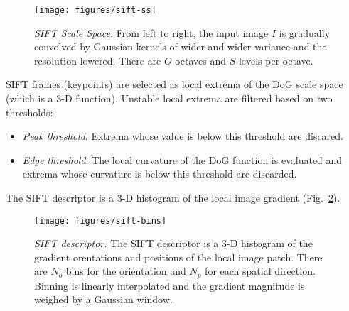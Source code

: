 \documentclass{article}
\begin{document}
\begin{figure}
\begin{center}
\texttt{[image: figures/sift-ss]}
\end{center}
\caption{{\em SIFT Scale Space.} From left to right, the input image
  $I$ is gradually convolved by Gaussian kernels of wider and wider
  variance and the resolution lowered. There are $O$ octaves and $S$
  levels per octave.}\label{fig:sift-ss}
\end{figure}

 SIFT frames (keypoints) are selected as
local extrema of the DoG scale space (which is a 3-D
function). Unstable local extrema are filtered based on two
thresholds:
\begin{itemize}
\item {\em Peak threshold}. Extrema whose value is below this
  threshold are discared.
\item {\em Edge threshold}. The local curvature of the DoG function is
  evaluated and extrema whose curvature is below this threshold are
  discarded.
\end{itemize}

 The SIFT descriptor is a 3-D histogram of
the local image gradient (Fig.~\ref{fig:sift-bins}).

\begin{figure}
\begin{center}
\texttt{[image: figures/sift-bins]}
\end{center}
\caption{{\em SIFT descriptor.} The SIFT descriptor is a 3-D histogram
  of the gradient orentations and positions of the local image
  patch. There are $N_o$ bins for the orientation and $N_p$ for each
  spatial direction. Binning is linearly interpolated and the gradient
  magnitude is weighed by a Gaussian window.}\label{fig:sift-bins}
\end{figure}

\end{document}
